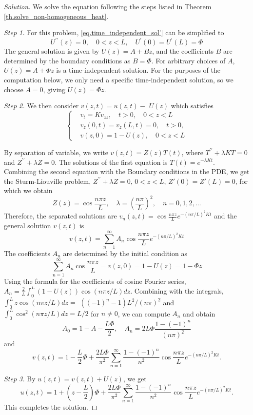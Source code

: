 \begin{proof}[Solution] We solve the equation following the steps listed in Theorem \ref{th.solve_non-homogeneous_heat}.

\textit{Step 1.} For this problem, \eqref{eq.time_independent_sol'} can be simplified to 
$$
U^{\prime \prime}(z)=0, \quad 0<z<L, \quad U^{\prime}(0)=U^{\prime}(L)=\Phi
$$
The general solution is given by $U(z)=A+Bz$, and the coefficients $B$ are determined by the boundary conditions as $B=\Phi$. For arbitrary choices of $A$, $U(z)=A+\Phi z$ is a time-independent solution. For the purposes of the computation below, we only need a specific time-independent solution, so we choose $A = 0$, giving $U(z)=\Phi z$.

\textit{Step 2.} We then consider $v(z, t)=u(z, t)-$ $U(z)$ which satisfies
$$
    \left\{\begin{aligned}
        & v_t=K v_{z z}, \quad t>0, \quad 0<z<L 
        \\
        &v_z(0, t)=v_z(L, t)=0, \quad t>0, 
        \\
        &v(z, 0)=1-U(z), \quad 0<z<L
        \end{aligned}\right.
    $$

By separation of variable, we write $v(z, t)=Z(z) T(t)$, where $T^{\prime \prime}+\lambda K T=0$ and $Z^{\prime \prime}+\lambda Z=0$. The solutions of the first equation is $T(t)=e^{-\lambda K t}$. Combining the second equation with the Boundary conditions in the PDE, we get the Sturm-Liouville problem, $Z^{\prime \prime}+\lambda Z=0$, $0<z<L$, $Z'(0)=Z'(L)=0$, for which we obtain
    $$
    Z(z)=\cos \frac{n \pi z}{L}, \quad \lambda=\left(\frac{n \pi}{L}\right)^2, \quad n=0,1,2, \ldots
    $$
Therefore, the separated solutions are $v_n(z, t)=\cos \frac{n \pi z}{L} e^{-(n \pi / L)^2 K t}$ and the general solution $v(z, t)$ is
    $$
    v(z, t)=\sum_{n=1}^{\infty} A_n \cos \frac{n \pi z}{L} e^{-(n \pi / L)^2 K t}
    $$
The coefficients $A_n$ are determined by the initial condition as    
    $$
    \sum_{n=1}^{\infty} A_n \cos \frac{n \pi z}{L} = v(z, 0)=1-U(z)=1-\Phi z
    $$
    Using the formula for the coefficients of cosine Fourier series, $A_n = \frac{2}{L}\int_0^L (1-U(z))\cos (n \pi z / L) d z$. Combining with the integrals, $\int_0^L z \cos (n \pi z / L) d z=$ $\left((-1)^n-1\right) L^2 /(n \pi)^2$ and $ \int_0^L \cos ^2(n \pi z / L) d z=L / 2$ for $n \neq 0$, we can compute $A_n$ and obtain
    $$
    A_0=1-A-\frac{L \Phi}{2}, \quad A_n=2 L \Phi \frac{1-(-1)^n}{(n \pi)^2}
    $$
and
    $$
    v(z, t)=1-\frac{L}{2}\Phi+\frac{2 L \Phi}{\pi^2} \sum_{n=1}^{\infty} \frac{1-(-1)^n}{n^2} \cos \frac{n \pi z}{L} e^{-(n \pi / L)^2 K t}.
    $$


\textit{Step 3.} By $u(z, t) = v(z, t) + U(z)$, we get
    $$
    u(z, t)=1+\left(z-\frac{L}{2}\right) \Phi+\frac{2 L \Phi}{\pi^2} \sum_{n=1}^{\infty} \frac{1-(-1)^n}{n^2} \cos \frac{n \pi z}{L} e^{-(n \pi / L)^2 K t}.
    $$       
This completes the solution.
\end{proof}

